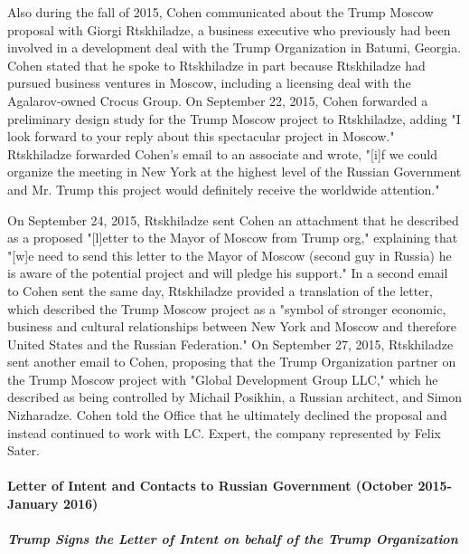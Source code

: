 Also during the fall of 2015, Cohen communicated about the Trump Moscow proposal with Giorgi Rtskhiladze, a business executive who previously had been involved in a development deal with the Trump Organization in Batumi, Georgia.
Cohen stated that he spoke to Rtskhiladze in part because Rtskhiladze had pursued business ventures in Moscow, including a licensing deal with the Agalarov-owned Crocus Group.%
On September 22, 2015, Cohen forwarded a preliminary design study for the Trump Moscow project to Rtskhiladze, adding "I look forward to your reply about this spectacular project in Moscow."
Rtskhiladze forwarded Cohen's email to an associate and wrote, "[i]f we could organize the meeting in New York at the highest level of the Russian Government and Mr. Trump this project would definitely receive the worldwide attention."

On September 24, 2015, Rtskhiladze sent Cohen an attachment that he described as a proposed "[l]etter to the Mayor of Moscow from Trump org," explaining that "[w]e need to send this letter to the Mayor of Moscow (second guy in Russia) he is aware of the potential project and will pledge his support."
In a second email to Cohen sent the same day, Rtskhiladze provided a translation of the letter, which described the Trump Moscow project as a "symbol of stronger economic, business and cultural relationships between New York and Moscow and therefore United States and the Russian Federation."
On September 27, 2015, Rtskhiladze sent another email to Cohen, proposing that the Trump Organization partner on the Trump Moscow project with "Global Development Group LLC," which he described as being controlled by Michail Posikhin, a Russian architect, and Simon Nizharadze.
Cohen told the Office that he ultimately declined the proposal and instead continued to work with LC. Expert, the company represented by Felix Sater.

\paragraph{Letter of Intent and Contacts to Russian Government (October 2015-January 2016)}

\subparagraph{Trump Signs the Letter of Intent on behalf of the Trump Organization}

